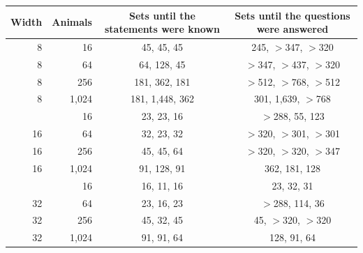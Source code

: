 \begin{tabular}{@{}rrcc@{}}
\toprule
Width & Animals & Sets until the statements were known & Sets until the questions were answered \\
\midrule
8 & 16 & 45, 45, 45 & 245, $>$347, $>$320 \\
8 & 64 & 64, 128, 45 & $>$347, $>$437, $>$320 \\
8 & 256 & 181, 362, 181 & $>$512, $>$768, $>$512 \\
8 & 1{,}024 & 181, 1{,}448, 362 & 301, 1{,}639, $>$768 \\
\addlinespace[3pt]
16 & 16 & 23, 23, 16 & $>$288, 55, 123 \\
16 & 64 & 32, 23, 32 & $>$320, $>$301, $>$301 \\
16 & 256 & 45, 45, 64 & $>$320, $>$320, $>$347 \\
16 & 1{,}024 & 91, 128, 91 & 362, 181, 128 \\
\addlinespace[3pt]
32 & 16 & 16, 11, 16 & 23, 32, 31 \\
32 & 64 & 23, 16, 23 & $>$288, 114, 36 \\
32 & 256 & 45, 32, 45 & 45, $>$320, $>$320 \\
32 & 1{,}024 & 91, 91, 64 & 128, 91, 64 \\
\bottomrule
\end{tabular}
